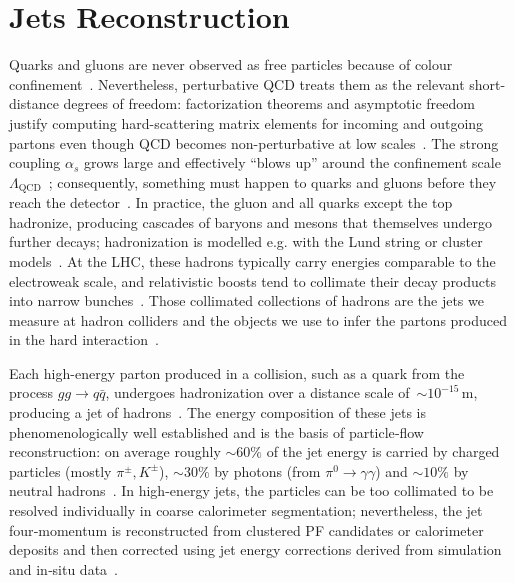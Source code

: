 \section{Jets Reconstruction}\label{sec:jets}

Quarks and gluons are never observed as free particles because of colour confinement~\cite{Andersson:1983,Webber:1984}. Nevertheless, perturbative QCD treats them as the relevant short-distance degrees of freedom: factorization theorems and asymptotic freedom justify computing hard-scattering matrix elements for incoming and outgoing partons even though QCD becomes non-perturbative at low scales~\cite{Collins:1989}. The strong coupling $\alpha_s$ grows large and effectively ``blows up'' around the confinement scale $\Lambda_{\mathrm{QCD}}$~\cite{1674-1137-40-10-100001}; consequently, something must happen to quarks and gluons before they reach the detector~\cite{Sjostrand:2014zea}. In practice, the gluon and all quarks except the top hadronize, producing cascades of baryons and mesons that themselves undergo further decays; hadronization is modelled e.g. with the Lund string or cluster models~\cite{Andersson:1983,Webber:1984,Sjostrand:2014zea}. At the LHC, these hadrons typically carry energies comparable to the electroweak scale, and relativistic boosts tend to collimate their decay products into narrow bunches~\cite{Salam:2010}. Those collimated collections of hadrons are the jets we measure at hadron colliders and the objects we use to infer the partons produced in the hard interaction~\cite{Salam:2010,Cacciari:2008gp}.

Each high-energy parton produced in a collision, such as a quark from the process $gg \rightarrow q\bar{q}$, undergoes hadronization over a distance scale of~$\sim10^{-15}\,\mathrm{m}$, producing a jet of hadrons~\cite{Andersson:1983,Sjostrand:2014zea}. The energy composition of these jets is phenomenologically well established and is the basis of particle‑flow reconstruction: on average roughly $\sim60\%$ of the jet energy is carried by charged particles (mostly $\pi^{\pm}, K^{\pm}$), $\sim30\%$ by photons (from $\pi^0\to\gamma\gamma$) and $\sim10\%$ by neutral hadrons~\cite{CMS:PF2017}. In high-energy jets, the particles can be too collimated to be resolved individually in coarse calorimeter segmentation; nevertheless, the jet four‑momentum is reconstructed from clustered PF candidates or calorimeter deposits and then corrected using jet energy corrections derived from simulation and in‑situ data~\cite{CMS:PF2017,Cacciari:2011ma,deFavereau:2013fsa}.

